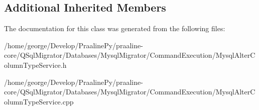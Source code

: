 \subsection*{Additional Inherited Members}


The documentation for this class was generated from the following files\+:\begin{DoxyCompactItemize}
\item 
/home/george/\+Develop/\+Praaline\+Py/praaline-\/core/\+Q\+Sql\+Migrator/\+Databases/\+Mysql\+Migrator/\+Command\+Execution/Mysql\+Alter\+Column\+Type\+Service.\+h\item 
/home/george/\+Develop/\+Praaline\+Py/praaline-\/core/\+Q\+Sql\+Migrator/\+Databases/\+Mysql\+Migrator/\+Command\+Execution/Mysql\+Alter\+Column\+Type\+Service.\+cpp\end{DoxyCompactItemize}
